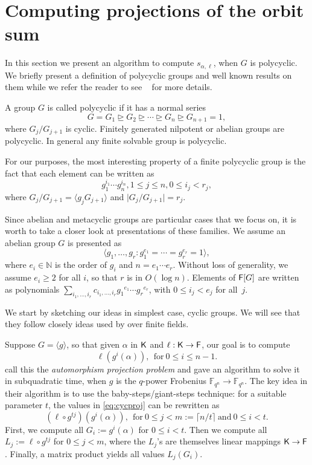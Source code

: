 \section{Computing projections of the orbit sum}
\label{sec:osum}

In this section we present an algorithm to compute $s_{\alpha,\ell}$,
when $G$ is polycyclic. We briefly present a definition of polycyclic 
groups and well known results on them while we refer the reader to
see ~\cite[Chapter 8]{HoEiOb05} for more details.

A group $G$ is called polycyclic if it has a normal series 
$$G = G_1 \unrhd G_2 \unrhd \cdots \unrhd G_n \unrhd G_{n+1} = 1,$$
where $G_j/G_{j+1}$ is cyclic. Finitely generated nilpotent or 
abelian groups are polycyclic. In general any finite solvable group is 
polycyclic.

For our purposes, the most interesting property of a finite polycyclic 
group is the fact that each element can be written as 
$$g_1^{i_1} \cdots g_n^{i_n}, 1 \leq j \leq n, 0 \leq i_j < r_j,$$
where $G_j/G_{j+1} = \langle g_jG_{j+1} \rangle$ and 
$\vert G_j/G_{j+1}\vert = r_j$.

Since abelian and metacyclic groups are particular cases that we focus on,
it is worth to take a closer look at presentations of these families.
We assume an abelian group $G$ is presented as 
\[ \label{eq:abeliangrp}
  \langle g_1, \ldots , g_r: g_{1}^{e_1} = \cdots = g_{r}^{e_r} = 1
  \rangle,
\]
where $ e_i \in \mathbb{N}$ is the order of $g_i$ and $n = e_1 \cdots
e_r$.  Without loss of generality, we assume $e_i \ge 2$ for all $i$,
so that $r$ is in $O(\log n)$. Elements of ${\mathsf{F}}[G]$ are written as
polynomials $\sum_{i_1,\dots,i_r} c_{i_1,\dots,i_r}
{g_1}^{e_1} \cdots {g_r}^{e_r}$, with $0\le i_j < e_j$ for all~$j$.

We start by sketching our
ideas in simplest case, cyclic groups.  We will see that they follow
closely ideas used by \cite{KalSho98} over finite fields.

Suppose $G = \langle g \rangle$, so that given $\alpha$ in ${\mathsf{K}}$ and
$\ell: {\mathsf{K}} \to {\mathsf{F}}$, our goal is to compute
\begin{equation}
  \label{eq:cycproj}
  \ell(g^i(\alpha)), ~~\mbox{for}~ 0\leq i\leq n-1.
\end{equation}
\cite{KalSho98} call this the \emph{automorphism projection problem} and
gave an algorithm to solve it in subquadratic time, when $g$ is the
$q$-power Frobenius $\mathbb{F}_{q^n} \to \mathbb{F}_{q^n}$.  The key idea in their
algorithm is to use the baby-steps/giant-steps technique: for a suitable
parameter $t$, the values in \eqref{eq:cycproj} can be rewritten as
\[
  (\ell \circ g^{tj})(g^i(\alpha)), ~~\mbox{for}~ 0 \leq j < m:=\lceil n/t
  \rceil ~\mbox{and}~ 0 \leq i <t.
\]
First, we compute all $G_i:=g^i(\alpha)$ for $0 \leq i <t$.  Then we compute
all $L_j:=\ell \circ g^{tj}$ for $0 \leq j <m$, where the $L_j$'s are
themselves linear mappings ${\mathsf{K}} \to {\mathsf{F}}$.  Finally, a matrix product yields
all values $L_j(G_i)$.

